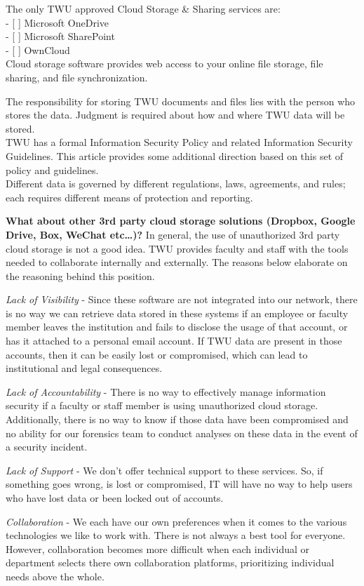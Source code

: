 \documentclass[
]{book}
\theoremstyle{definition}
\theoremstyle{definition}
\theoremstyle{definition}
\theoremstyle{definition}
\theoremstyle{remark}
\begin{document}
The only TWU approved Cloud Storage \& Sharing services are:\\
- {[} {]} Microsoft OneDrive\\
- {[} {]} Microsoft SharePoint\\
- {[} {]} OwnCloud\\
Cloud storage software provides web access to your online file storage, file sharing, and file synchronization.

The responsibility for storing TWU documents and files lies with the person who stores the data. Judgment is required about how and where TWU data will be stored.\\
TWU has a formal Information Security Policy and related Information Security Guidelines. This article provides some additional direction based on this set of policy and guidelines.\\
Different data is governed by different regulations, laws, agreements, and rules; each requires different means of protection and reporting.

\textbf{What about other 3rd party cloud storage solutions (Dropbox, Google Drive, Box, WeChat etc\ldots)?}
In general, the use of unauthorized 3rd party cloud storage is not a good idea. TWU provides faculty and staff with the tools needed to collaborate internally and externally. The reasons below elaborate on the reasoning behind this position.

\emph{Lack of Visibility} - Since these software are not integrated into our network, there is no way we can retrieve data stored in these systems if an employee or faculty member leaves the institution and fails to disclose the usage of that account, or has it attached to a personal email account. If TWU data are present in those accounts, then it can be easily lost or compromised, which can lead to institutional and legal consequences.

\emph{Lack of Accountability} - There is no way to effectively manage information security if a faculty or staff member is using unauthorized cloud storage. Additionally, there is no way to know if those data have been compromised and no ability for our forensics team to conduct analyses on these data in the event of a security incident.

\emph{Lack of Support} - We don't offer technical support to these services. So, if something goes wrong, is lost or compromised, IT will have no way to help users who have lost data or been locked out of accounts.

\emph{Collaboration} - We each have our own preferences when it comes to the various technologies we like to work with. There is not always a best tool for everyone. However, collaboration becomes more difficult when each individual or department selects there own collaboration platforms, prioritizing individual needs above the whole.
\end{document}
